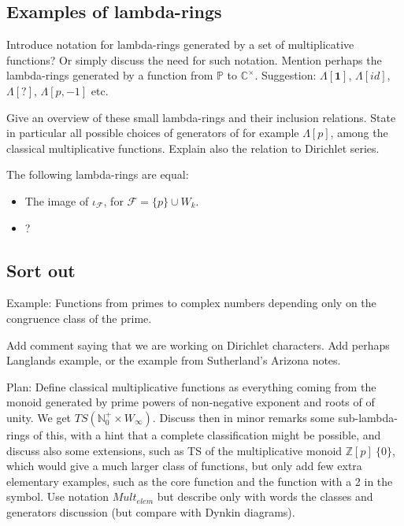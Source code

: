 \documentclass[a4paper]{article}
\begin{document}
\subsection{Examples of lambda-rings}

Introduce notation for lambda-rings generated by a set of multiplicative functions? Or simply discuss the need for such notation. Mention perhaps the lambda-rings generated by a function from $\mathbb{P}$ to $\mathbb{C}^{\times}$. Suggestion: $\Lambda[\mathbf{1}]$, $\Lambda[id]$, $\Lambda[?]$, $\Lambda[p, -1]$ etc. 

Give an overview of these small lambda-rings and their inclusion relations. State in particular all possible choices of generators of for example $\Lambda[p]$, among the classical multiplicative functions. Explain also the relation to Dirichlet series.

\begin{proposition}
The following lambda-rings are equal:
\begin{itemize}
\item The image of $\iota_{\mathcal{F}}$, for $\mathcal{F} = \{ p \} \cup W_k$. 
\item ?
\end{itemize}

\end{proposition}



\subsection{Sort out}

Example: Functions from primes to complex numbers depending only on the congruence class of the prime.

Add comment saying that we are working on Dirichlet characters. Add perhaps Langlands example, or the example from Sutherland's Arizona notes.


Plan: Define classical multiplicative functions as everything coming from the monoid generated by prime powers of non-negative exponent and roots of of unity. We get $TS(\mathbb{N}_0^{+} \times W_{\infty})$. Discuss then in minor remarks some sub-lambda-rings of this, with a hint that a complete classification might be possible, and discuss also some extensions, such as TS of the multiplicative monoid $\mathbb{Z}[p] \ \{0\}$, which would give a much larger class of functions, but only add few extra elementary examples, such as the core function and the function with a 2 in the symbol. Use notation $Mult_{elem}$ but describe only with words the classes and generators discussion (but compare with Dynkin diagrams). 
\end{document}
